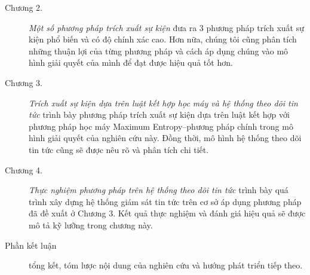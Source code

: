 \begin{preface}
\begin{description}
        \item[Chương 2.] \emph{Một số phương pháp trích xuất sự kiện} đưa ra
        3 phương pháp trích xuất sự kiện phổ biến và có độ chính xác cao. Hơn
        nữa, chúng tôi cũng phân tích những thuận lợi của từng phương pháp và
        cách áp dụng chúng vào mô hình giải quyết của mình để đạt được hiệu quả
        tốt hơn.

        \item[Chương 3.] \emph{Trích xuất sự kiện dựa trên luật kết hợp học máy
		và hệ thống theo dõi tin tức} trình bày phương pháp trích xuất sự kiện
        dựa trên luật kết hợp với phương pháp học máy Maximum Entropy--phương
        pháp chính trong mô hình giải quyết của nghiên cứu này. Đồng thời, mô
		hình hệ thống theo dõi tin tức cũng sẽ được nêu rõ và phân tích chi
		tiết.


        \item[Chương 4.] \emph{Thực nghiệm phương pháp trên hệ thống theo dõi
        tin tức} trình bày quá trình xây dựng hệ thống giám sát tin tức trên cơ
        sở  áp dụng phương pháp đã đề xuất ở Chương 3. Kết quả thực nghiệm và
        đánh giá hiệu quả sẽ được mô tả kỹ lưỡng trong chương này.


		\item[Phần kết luận] tổng kết, tóm lược nội dung của nghiên cứu
	    và hướng phát triển tiếp theo.
	\end{description}

\end{preface}
\endinput
